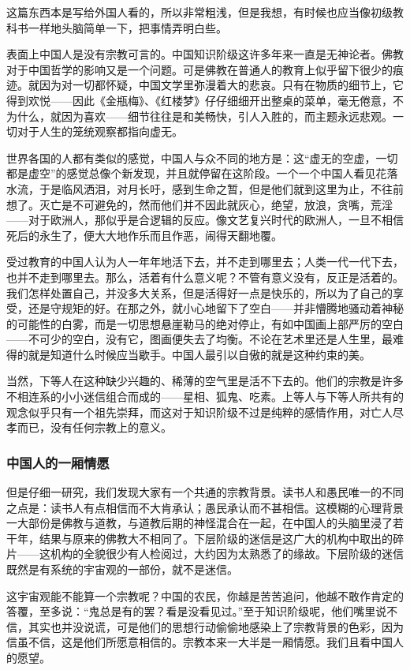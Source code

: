 \par 这篇东西本是写给外国人看的，所以非常粗浅，但是我想，有时候也应当像初级教科书一样地头脑简单一下，把事情弄明白些。
\par 表面上中国人是没有宗教可言的。中国知识阶级这许多年来一直是无神论者。佛教对于中国哲学的影响又是一个问题。可是佛教在普通人的教育上似乎留下很少的痕迹。就因为对一切都怀疑，中国文学里弥漫着大的悲哀。只有在物质的细节上，它得到欢悦——因此《金瓶梅》、《红楼梦》仔仔细细开出整桌的菜单，毫无倦意，不为什么，就因为喜欢——细节往往是和美畅快，引人入胜的，而主题永远悲观。一切对于人生的笼统观察都指向虚无。
\par 世界各国的人都有类似的感觉，中国人与众不同的地方是：这“虚无的空虚，一切都是虚空”的感觉总像个新发现，并且就停留在这阶段。一个一个中国人看见花落水流，于是临风洒泪，对月长吁，感到生命之暂，但是他们就到这里为止，不往前想了。灭亡是不可避免的，然而他们并不因此就灰心，绝望，放浪，贪嘴，荒淫——对于欧洲人，那似乎是合逻辑的反应。像文艺复兴时代的欧洲人，一旦不相信死后的永生了，便大大地作乐而且作恶，闹得天翻地覆。
\par 受过教育的中国人认为人一年年地活下去，并不走到哪里去；人类一代一代下去，也并不走到哪里去。那么，活着有什么意义呢？不管有意义没有，反正是活着的。我们怎样处置自己，并没多大关系，但是活得好一点是快乐的，所以为了自己的享受，还是守规矩的好。在那之外，就小心地留下了空白——并非懵腾地骚动着神秘的可能性的白雾，而是一切思想悬崖勒马的绝对停止，有如中国画上部严厉的空白——不可少的空白，没有它，图画便失去了均衡。不论在艺术里还是人生里，最难得的就是知道什么时候应当歇手。中国人最引以自傲的就是这种约束的美。
\par 当然，下等人在这种缺少兴趣的、稀薄的空气里是活不下去的。他们的宗教是许多不相连系的小小迷信组合而成的——星相、狐鬼、吃素。上等人与下等人所共有的观念似乎只有一个祖先崇拜，而这对于知识阶级不过是纯粹的感情作用，对亡人尽孝而已，没有任何宗教上的意义。
\subsubsection*{中国人的一厢情愿}
\par 但是仔细一研究，我们发现大家有一个共通的宗教背景。读书人和愚民唯一的不同之点是：读书人有点相信而不大肯承认；愚民承认而不甚相信。这模糊的心理背景一大部份是佛教与道教，与道教后期的神怪混合在一起，在中国人的头脑里浸了若干年，结果与原来的佛教大不相同了。下层阶级的迷信是这广大的机构中取出的碎片——这机构的全貌很少有人检阅过，大约因为太熟悉了的缘故。下层阶级的迷信既然是有系统的宇宙观的一部份，就不是迷信。
\par 这宇宙观能不能算一个宗教呢？中国的农民，你越是苦苦追问，他越不敢作肯定的答覆，至多说：“鬼总是有的罢？看是没看见过。”至于知识阶级呢，他们嘴里说不信，其实也并没说谎，可是他们的思想行动偷偷地感染上了宗教背景的色彩，因为信虽不信，这是他们所愿意相信的。宗教本来一大半是一厢情愿。我们且看中国人的愿望。
